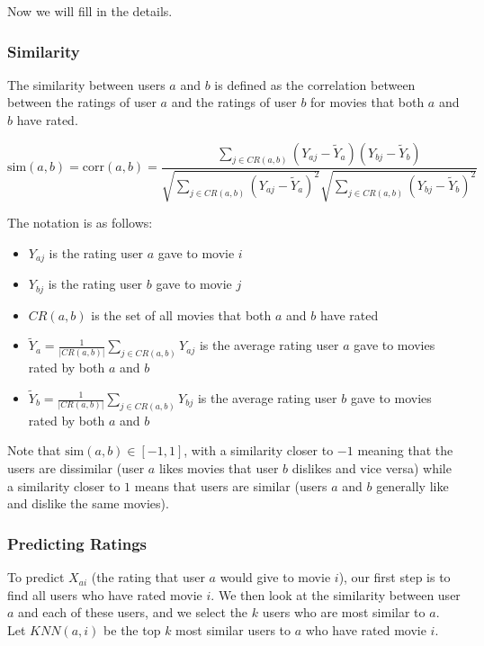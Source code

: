 \documentclass{article}
\begin{document}
\noindent
Now we will fill in the details.

\subsubsection{Similarity}

The similarity between users $a$ and $b$ is defined as the correlation between between the ratings of user $a$ and the ratings of user $b$ for movies that both $a$ and $b$ have rated.

$$\textrm{sim}(a,b) = \textrm{corr}(a,b) = \frac{\sum_{j \in CR(a,b)} (Y_{aj} - \widetilde{Y}_a)(Y_{bj} - \widetilde{Y}_b)}{\sqrt{\sum_{j \in CR(a,b)} (Y_{aj} - \widetilde{Y}_a)^2} \sqrt{\sum_{j \in CR(a,b)} (Y_{bj} - \widetilde{Y}_b)^2}}$$

\noindent
The notation is as follows:

\begin{itemize}
    \item $Y_{aj}$ is the rating user $a$ gave to movie $i$
    
    \item $Y_{bj}$ is the rating user $b$ gave to movie $j$
    
    \item $CR(a,b)$ is the set of all movies that both $a$ and $b$ have rated
    
    \item  $\widetilde{Y}_a = \frac{1}{|CR(a,b)|} \sum_{j \in CR(a,b)} Y_{aj}$ is the average rating user $a$ gave to movies rated by both $a$ and $b$
    
    \item  $\widetilde{Y}_b = \frac{1}{|CR(a,b)|} \sum_{j \in CR(a,b)} Y_{bj}$ is the average rating user $b$ gave to movies rated by both $a$ and $b$
\end{itemize}

Note that $\textrm{sim}(a,b) \in [-1,1]$, with a similarity closer to $-1$ meaning that the users are dissimilar (user $a$ likes movies that user $b$ dislikes and vice versa) while a similarity closer to $1$ means that users are similar (users $a$ and $b$ generally like and dislike the same movies).

\subsubsection{Predicting Ratings}

To predict $X_{ai}$ (the rating that user $a$ would give to movie $i$), our first step is to find all users who have rated movie $i$. We then look at the similarity between user $a$ and each of these users, and we select the $k$ users who are most similar to $a$. Let $KNN(a,i)$ be the top $k$ most similar users to $a$ who have rated movie $i$.
\end{document}
